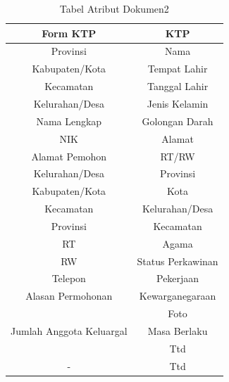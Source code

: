 \begin{table}
\caption{Tabel Atribut Dokumen2}
\centering
\begin{tabular}{|c|c|}
\hline
\textbf{Form KTP}&\textbf{KTP}\\
\hline
Provinsi&Nama\\
\hline
Kabupaten/Kota&Tempat Lahir\\
\hline
Kecamatan&Tanggal Lahir\\
\hline
Kelurahan/Desa&Jenis Kelamin\\
\hline
Nama Lengkap&Golongan Darah\\
\hline
NIK&Alamat\\
\hline
Alamat Pemohon&RT/RW\\
\hline
Kelurahan/Desa&Provinsi\\
\hline
Kabupaten/Kota&Kota\\
\hline
Kecamatan&Kelurahan/Desa\\
\hline
Provinsi&Kecamatan\\
\hline
RT&Agama\\
\hline
RW&Status Perkawinan\\
\hline
Telepon&Pekerjaan\\
\hline
Alasan Permohonan&Kewarganegaraan\\
\hline
 & Foto\\
\hline
Jumlah Anggota Keluargal&Masa Berlaku\\
\hline
 &Ttd\\
\hline
-&Ttd\\
\hline
\end{tabular}
\end{table}


